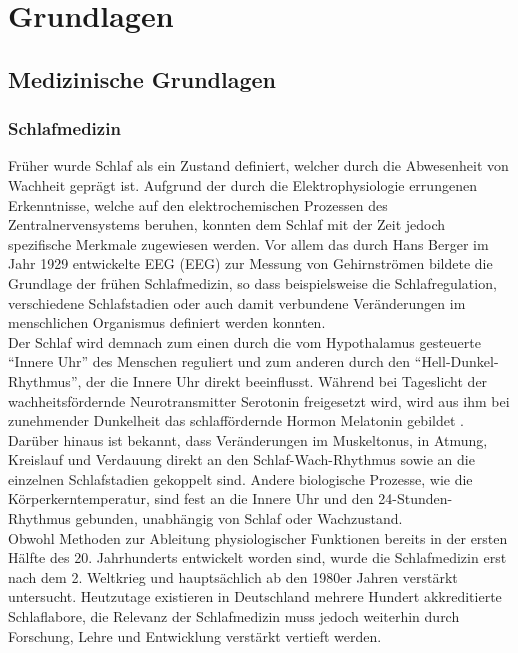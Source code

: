 \chapter{Grundlagen}


\section{Medizinische Grundlagen}\label{medgrundlagen} 


\subsection{Schlafmedizin}\label{schlafmedizin} 

Früher wurde Schlaf als ein Zustand definiert, welcher durch die Abwesenheit von Wachheit geprägt ist. Aufgrund der durch die Elektrophysiologie errungenen Erkenntnisse, welche auf den elektrochemischen Prozessen des Zentralnervensystems beruhen, konnten dem Schlaf mit der Zeit jedoch spezifische Merkmale zugewiesen werden. Vor allem das durch Hans Berger im Jahr 1929 entwickelte \acl{EEG} (\acs{EEG}) zur Messung von Gehirnströmen bildete die Grundlage der frühen Schlafmedizin, so dass beispielsweise die Schlafregulation, verschiedene Schlafstadien oder auch damit verbundene Veränderungen im menschlichen Organismus definiert werden konnten. \parencite{ebner_eeg_2006, penzel_schlafstorungen_2005}\\

Der Schlaf wird demnach zum einen durch die vom Hypothalamus gesteuerte "`Innere Uhr"' des Menschen reguliert und zum anderen durch den "`Hell-Dunkel-Rhythmus"', der die Innere Uhr direkt beeinflusst. Während bei Tageslicht der wachheitsfördernde Neurotransmitter Serotonin freigesetzt wird, wird aus ihm bei zunehmender Dunkelheit das schlaffördernde Hormon Melatonin gebildet \parencite{steinberg_schlafmedizin_2010}. Darüber hinaus ist bekannt, dass Veränderungen im Muskeltonus, in Atmung, Kreislauf und Verdauung direkt an den Schlaf-Wach-Rhythmus sowie an die einzelnen Schlafstadien gekoppelt sind. Andere biologische Prozesse, wie die Körperkerntemperatur, sind fest an die Innere Uhr und den 24-Stunden-Rhythmus gebunden, unabhängig von Schlaf oder Wachzustand. \parencite{penzel_schlafstorungen_2005, rasche_update_2003}\\

Obwohl Methoden zur Ableitung physiologischer Funktionen bereits in der ersten Hälfte des 20. Jahrhunderts entwickelt worden sind, wurde die Schlafmedizin erst nach dem 2. Weltkrieg und hauptsächlich ab den 1980er Jahren verstärkt untersucht. Heutzutage existieren in Deutschland mehrere Hundert akkreditierte Schlaflabore, die Relevanz der Schlafmedizin muss jedoch weiterhin durch Forschung, Lehre und Entwicklung verstärkt vertieft werden.\parencite{penzel_schlafstorungen_2005}\\

